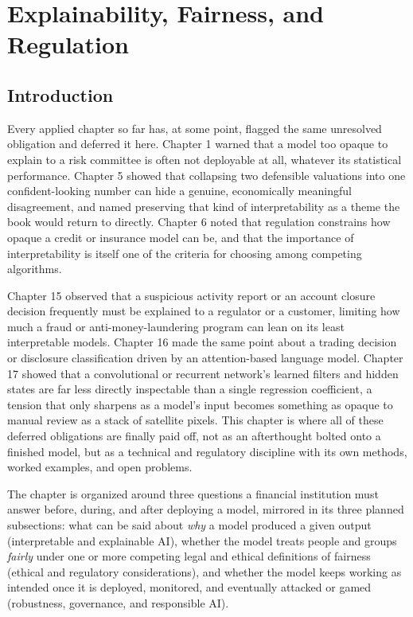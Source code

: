 \documentclass[../ai_in_finance]{subfiles}
\begin{document}
\chapter{Explainability, Fairness, and Regulation}

\section{Introduction}

Every applied chapter so far has, at some point, flagged the same unresolved obligation and deferred it here. Chapter 1 warned that a model too opaque to explain to a risk committee is often not deployable at all, whatever its statistical performance. Chapter 5 showed that collapsing two defensible valuations into one confident-looking number can hide a genuine, economically meaningful disagreement, and named preserving that kind of interpretability as a theme the book would return to directly. Chapter 6 noted that regulation constrains how opaque a credit or insurance model can be, and that the importance of interpretability is itself one of the criteria for choosing among competing algorithms.

Chapter 15 observed that a suspicious activity report or an account closure decision frequently must be explained to a regulator or a customer, limiting how much a fraud or anti-money-laundering program can lean on its least interpretable models. Chapter 16 made the same point about a trading decision or disclosure classification driven by an attention-based language model. Chapter 17 showed that a convolutional or recurrent network's learned filters and hidden states are far less directly inspectable than a single regression coefficient, a tension that only sharpens as a model's input becomes something as opaque to manual review as a stack of satellite pixels. This chapter is where all of these deferred obligations are finally paid off, not as an afterthought bolted onto a finished model, but as a technical and regulatory discipline with its own methods, worked examples, and open problems.

The chapter is organized around three questions a financial institution must answer before, during, and after deploying a model, mirrored in its three planned subsections: what can be said about \emph{why} a model produced a given output (interpretable and explainable AI), whether the model treats people and groups \emph{fairly} under one or more competing legal and ethical definitions of fairness (ethical and regulatory considerations), and whether the model keeps working as intended once it is deployed, monitored, and eventually attacked or gamed (robustness, governance, and responsible AI).
\end{document}
